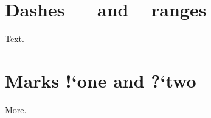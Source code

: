 \documentclass{article}
\begin{document}
\section{Dashes --- and -- ranges}
Text.
\section{Marks !`one and ?`two}
More.
\end{document}
